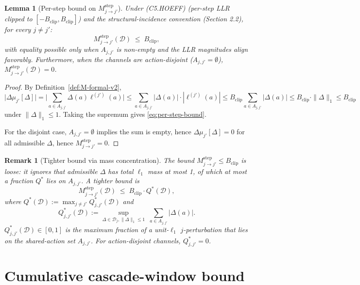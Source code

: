 \documentclass{article}
\newtheorem{lemma}{Lemma}
\newtheorem{remark}{Remark}
\newcommand{\Bclip}{B_{\mathrm{clip}}}
\begin{document}
\begin{lemma}[Per-step bound on $M_{j \to j'}^{\mathrm{step}}$]
\label{lem:per-step}
Under (C5.HOEFF) (per-step LLR clipped to $[-\Bclip, \Bclip]$) and
the structural-incidence convention (Section 2.2), for every $j
\neq j'$:
\begin{equation}
\label{eq:per-step-bound}
  M_{j \to j'}^{\mathrm{step}}(\mathcal{D}) \;\leq\; \Bclip,
\end{equation}
with equality possible only when $A_{j, j'}$ is non-empty and the
LLR magnitudes align favorably.  Furthermore, when the channels
are action-disjoint ($A_{j, j'} = \emptyset$),
$M_{j \to j'}^{\mathrm{step}}(\mathcal{D}) = 0$.
\end{lemma}

\begin{proof}
By Definition~\ref{def:M-formal-v2},
\[
  \big| \Delta\mu_{j'}[\Delta] \big|
  = \big| \sum_{a \in A_{j, j'}} \Delta(a) \ell^{(j')}(a) \big|
  \leq \sum_{a \in A_{j, j'}} |\Delta(a)| \cdot |\ell^{(j')}(a)|
  \leq \Bclip \sum_{a \in A_{j, j'}} |\Delta(a)|
  \leq \Bclip \cdot \|\Delta\|_1
  \leq \Bclip
\]
under $\|\Delta\|_1 \leq 1$.  Taking the supremum gives
\eqref{eq:per-step-bound}.

For the disjoint case, $A_{j, j'} = \emptyset$ implies the sum is
empty, hence $\Delta\mu_{j'}[\Delta] = 0$ for all admissible
$\Delta$, hence $M_{j \to j'}^{\mathrm{step}} = 0$.
\end{proof}

\begin{remark}[Tighter bound via mass concentration]
\label{rem:tighter-bound}
The bound $M_{j \to j'}^{\mathrm{step}} \leq \Bclip$ is loose: it
ignores that admissible $\Delta$ has total $\ell_1$ mass at most 1,
of which at most a fraction $Q^*$ lies on $A_{j, j'}$.  A tighter
bound is
\begin{equation}
\label{eq:tighter-bound}
  M_{j \to j'}^{\mathrm{step}}(\mathcal{D}) \;\leq\;
  \Bclip \cdot Q^*(\mathcal{D}),
\end{equation}
where $Q^*(\mathcal{D}) := \max_{j \neq j'} Q^*_{j, j'}(\mathcal{D})$
and
\[
  Q^*_{j, j'}(\mathcal{D}) := \sup_{\Delta \in \mathcal{D}_j,
  \|\Delta\|_1 \leq 1} \;\sum_{a \in A_{j, j'}} |\Delta(a)|.
\]
$Q^*_{j, j'}(\mathcal{D}) \in [0, 1]$ is the maximum fraction of a
unit-$\ell_1$ $j$-perturbation that lies on the shared-action set
$A_{j, j'}$.  For action-disjoint channels, $Q^*_{j,j'} = 0$.
\end{remark}

\section{Cumulative cascade-window bound}
\end{document}
